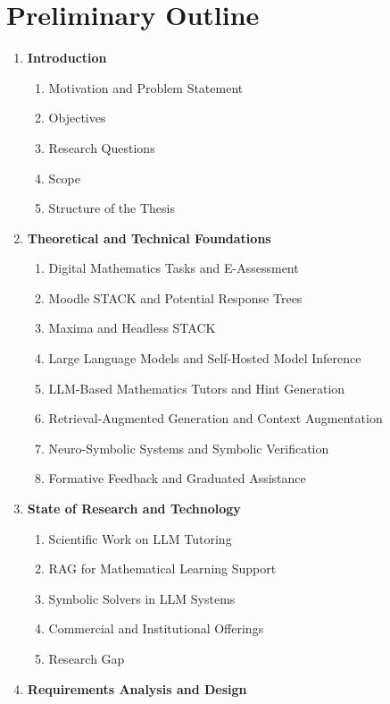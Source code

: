 \documentclass[11pt,a4paper,oneside,ngerman]{memoir}
\begin{document}
\chapter{Preliminary Outline}
\begin{enumerate}
    \item \textbf{Introduction}
    \begin{enumerate}
        \item Motivation and Problem Statement
        \item Objectives
        \item Research Questions
        \item Scope
        \item Structure of the Thesis
    \end{enumerate}
    \item \textbf{Theoretical and Technical Foundations}
    \begin{enumerate}
        \item Digital Mathematics Tasks and E-Assessment
        \item Moodle STACK and Potential Response Trees
        \item Maxima and Headless STACK
        \item Large Language Models and Self-Hosted Model Inference
        \item LLM-Based Mathematics Tutors and Hint Generation
        \item Retrieval-Augmented Generation and Context Augmentation
        \item Neuro-Symbolic Systems and Symbolic Verification
        \item Formative Feedback and Graduated Assistance
    \end{enumerate}
    \item \textbf{State of Research and Technology}
    \begin{enumerate}
        \item Scientific Work on LLM Tutoring
        \item RAG for Mathematical Learning Support
        \item Symbolic Solvers in LLM Systems
        \item Commercial and Institutional Offerings
        \item Research Gap
    \end{enumerate}
    \item \textbf{Requirements Analysis and Design}
    \begin{enumerate}

\end{enumerate}
\end{enumerate}
\end{document}
